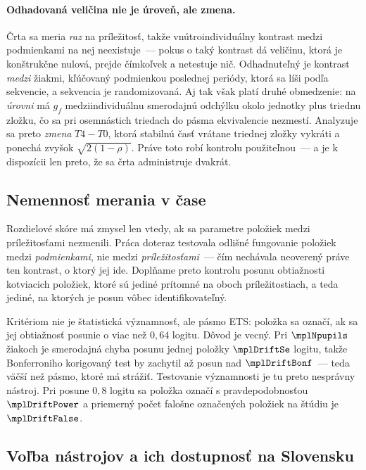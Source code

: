 \paragraph{Odhadovaná veličina nie je úroveň, ale zmena.} Črta sa meria \emph{raz} na príležitosť, takže vnútroindividuálny kontrast medzi podmienkami na nej neexistuje~--- pokus o taký kontrast dá veličinu, ktorá je konštrukčne nulová, prejde čímkoľvek a netestuje nič. Odhadnuteľný je kontrast \emph{medzi} žiakmi, kľúčovaný podmienkou poslednej periódy, ktorá sa líši podľa sekvencie, a sekvencia je randomizovaná. Aj tak však platí druhé obmedzenie: na \emph{úrovni} má $g_f$ medziindividuálnu smerodajnú odchýlku okolo jednotky plus triednu zložku, čo sa pri osemnástich triedach do pásma ekvivalencie nezmestí. Analyzuje sa preto \emph{zmena} $T4-T0$, ktorá stabilnú časť vrátane triednej zložky vykráti a ponechá zvyšok $\sqrt{2(1-\rho)}$. Práve toto robí kontrolu použiteľnou~--- a je k dispozícii len preto, že sa črta administruje dvakrát.

\subsection{Nemennosť merania v čase}

Rozdielové skóre má zmysel len vtedy, ak sa parametre položiek medzi príležitosťami nezmenili. Práca doteraz testovala odlišné fungovanie položiek medzi \emph{podmienkami}, nie medzi \emph{príležitosťami}~--- čím nechávala neoverený práve ten kontrast, o ktorý jej ide. Doplňame preto kontrolu posunu obtiažnosti kotviacich položiek, ktoré sú jediné prítomné na oboch príležitostiach, a teda jediné, na ktorých je posun vôbec identifikovateľný.

Kritériom nie je štatistická významnosť, ale pásmo ETS: položka sa označí, ak sa jej obtiažnosť posunie o viac než $0{,}64$ logitu. Dôvod je vecný. Pri $\mplNpupils$ žiakoch je smerodajná chyba posunu jednej položky $\mplDriftSe$ logitu, takže Bonferroniho korigovaný test by zachytil až posun nad $\mplDriftBonf$~--- teda väčší než pásmo, ktoré má strážiť. Testovanie významnosti je tu preto nesprávny nástroj. Pri posune $0{,}8$ logitu sa položka označí s pravdepodobnosťou $\mplDriftPower$ a priemerný počet falošne označených položiek na štúdiu je $\mplDriftFalse$.

\subsection{Voľba nástrojov a ich dostupnosť na Slovensku}

